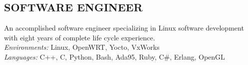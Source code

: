 \documentclass[line]{res}
\begin{document}
\address{San Mateo, CA}
\address{mathew.prokos@gmail.com}

\begin{resume}
\section{SOFTWARE ENGINEER}
    \vspace{1mm}
    An accomplished software engineer specializing in Linux software development with eight years of complete life cycle experience.\\

    \vspace{-5mm}
    {\sl Environments:} Linux, OpenWRT, Yocto, VxWorks\\
    {\sl Languages:} C++, C, Python, Bash, Ada95, Ruby, C\#, Erlang, OpenGL\\
\vspace{-5mm}

\end{resume}
\end{document}
